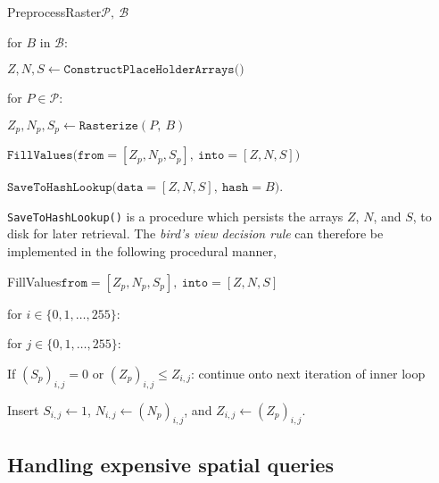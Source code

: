 \begin{pseudofunc}{PreprocessRaster}{$\mathcal{P},~\mathcal{B}$}
  \item for $B$ in $\mathcal{B}$:
  \begin{pseudoloop}
    \item $Z, N, S \leftarrow \texttt{ConstructPlaceHolderArrays()}$
    \item for $P \in \mathcal{P}$:
    \begin{pseudoloop}
      \item $Z_p, N_p, S_p \leftarrow \texttt{Rasterize}(P,~B)$
      \item $\texttt{FillValues(from}=[Z_p, N_p, S_p],~\texttt{into}=[Z, N, S])$
    \end{pseudoloop}
    \item $\texttt{SaveToHashLookup(data}=[Z, N, S],~\texttt{hash}=B)$.
  \end{pseudoloop}
\end{pseudofunc}
\texttt{SaveToHashLookup()} is a procedure which persists the arrays $Z$, $N$, and $S$, to disk for later retrieval.
The \textit{bird's view decision rule} can therefore be implemented in the following procedural manner,
\begin{pseudofunc}{FillValues}{$\texttt{from}=[Z_p, N_p, S_p],~\texttt{into}=[Z, N, S]$}
  \item for $i \in \{0, 1, \ldots, 255\}$:
  \begin{pseudoloop}
    \item for $j \in \{0, 1, \ldots, 255\}$:
    \begin{pseudoloop}
      \item If $(S_p)_{i,j} = 0$ or $(Z_p)_{i,j} \leq Z_{i,j}$: continue onto next iteration of inner loop
      \item Insert $S_{i,j} \leftarrow 1$, $N_{i,j} \leftarrow (N_p)_{i,j}$, and $Z_{i,j} \leftarrow (Z_p)_{i,j}$.
    \end{pseudoloop}
  \end{pseudoloop}
\end{pseudofunc}

\subsection{Handling expensive spatial queries}

